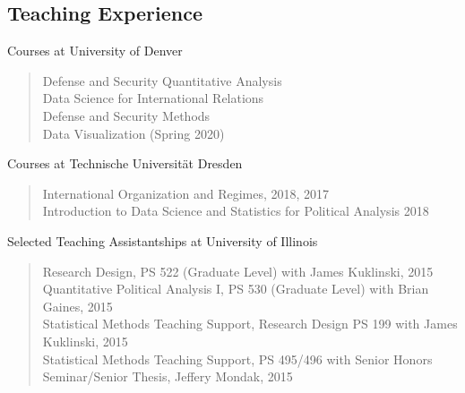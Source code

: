 \documentclass[margin, 10pt]{CVStyleTemplate}\usepackage[]{graphicx}\usepackage[]{color}
\begin{document}
\begin{resume}
\section{Teaching Experience}

Courses at University of Denver
\begin{quotation} \noindent
Defense and Security Quantitative Analysis \\[6pt]
Data Science for International Relations  \\[6pt]
Defense and Security Methods \\[6pt]
Data Visualization (Spring 2020)
\end{quotation}

Courses at Technische Universit\"{a}t Dresden
\begin{quotation} \noindent
International Organization and Regimes, 2018, 2017 \\[6pt] %
Introduction to Data Science and Statistics for Political Analysis 2018
\end{quotation}

Selected Teaching Assistantships at University of Illinois
\begin{quotation} \noindent
Research Design, PS 522 (Graduate Level) with James Kuklinski, 2015 \\[6pt] %
Quantitative Political Analysis I, PS 530 (Graduate Level) with Brian Gaines, 2015 \\[6pt] %
Statistical Methods Teaching Support, Research Design PS 199 with James Kuklinski, 2015\\[6pt] %
Statistical Methods Teaching Support, PS 495/496  with Senior Honors Seminar/Senior Thesis, Jeffery Mondak, 2015\\[6pt] %
\end{quotation}
%


\end{resume}
\end{document}
